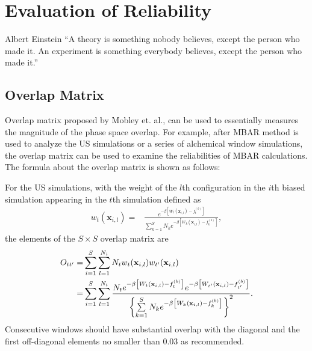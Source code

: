 \chapter{Evaluation of Reliability\label{chapter:Eva}}
\begin{chapquote}{Albert Einstein %
	}
	``A theory is something nobody believes, except the person who made it. An experiment is something everybody believes, except the person who made it.''
\end{chapquote}
\section{Overlap Matrix\label{Sec:Eva:OM}}
Overlap matrix proposed by Mobley et. al.,\cite{KlimovichJCAMD2015} can be used to essentially measures the magnitude of the phase space overlap. For example, after MBAR method is used to analyze the US simulations or a series of alchemical window simulations, the overlap matrix can be used to examine the reliabilities of MBAR calculations. The formula about the overlap matrix is shown as follows:

For the US simulations, with the weight of the $l$th configuration in the $i$th biased simulation appearing in the $t$th simulation defined as
\begin{align}
	w_{t}(\textbf{x}_{i,l})
	=&\frac{e^{-\beta \left[W_{t}(\textbf{x}_{i,l})-f_{t}^{(b)}\right]}}{\sum\limits_{k=1}^{S}N_{k}e^{-\beta\left[W_{k}(\textbf{x}_{i,l})-f_{k}^{(b)}\right]}},
	\label{Eq:weight3} 
\end{align}
the elements of the $S \times S$ overlap matrix are\cite{KlimovichJCAMD2015}
\begin{align}
	O_{tt^{\prime}} =&\sum\limits_{i=1}^{S}\sum\limits_{l=1}^{N_{i}}N_tw_{t}(\textbf{x}_{i,l})w_{t^\prime}(\textbf{x}_{i,l})\notag\\
	=&
	\sum\limits_{i=1}^{S}\sum\limits_{l=1}^{N_{i}}
	\frac{N_{t}e^{-\beta\left[W_{t}(\textbf{x}_{i,l})-f_{t}^{(b)}\right]}e^{-\beta \left[W_{t^{\prime}}(\textbf{x}_{i,l})-f_{t^{\prime}}^{(b)}\right]}}{\left\{\sum\limits_{k=1}^{S}N_{k}e^{-\beta\left[W_{k}(\textbf{x}_{i,l})-f_{k}^{(b)}\right]}\right\}^2}.
	\label{Eq:OM}
\end{align}
Consecutive windows should have substantial overlap with the diagonal and the first off-diagonal elements no smaller than 0.03 as recommended\cite{KlimovichJCAMD2015}. 

